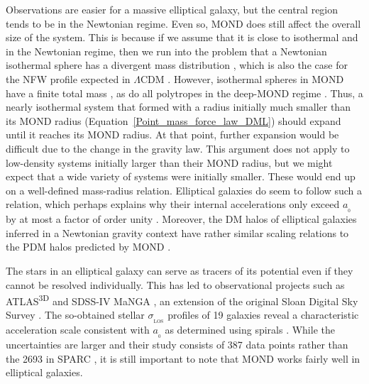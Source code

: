 \documentclass[fleqn,usenatbib,useAMS,onecolumn]{mnras} %
\begin{document}
Observations are easier for a massive elliptical galaxy, but the central region tends to be in the Newtonian regime. Even so, MOND does still affect the overall size of the system. This is because if we assume that it is close to isothermal and in the Newtonian regime, then we run into the problem that a Newtonian isothermal sphere has a divergent mass distribution \citep{Galactic_Dynamics}, which is also the case for the NFW profile expected in $\Lambda$CDM \citep*{Navarro_1997}. However, isothermal spheres in MOND have a finite total mass \citep{Milgrom_1984}, as do all polytropes in the deep-MOND regime \citep{Milgrom_2021_polytropes}. Thus, a nearly isothermal system that formed with a radius initially much smaller than its MOND radius (Equation~\ref{Point_mass_force_law_DML}) should expand until it reaches its MOND radius. At that point, further expansion would be difficult due to the change in the gravity law. This argument does not apply to low-density systems initially larger than their MOND radius, but we might expect that a wide variety of systems were initially smaller. These would end up on a well-defined mass-radius relation. Elliptical galaxies do seem to follow such a relation, which perhaps explains why their internal accelerations only exceed $a_{_0}$ by at most a factor of order unity \citep{Sanders_2000}. Moreover, the DM halos of elliptical galaxies inferred in a Newtonian gravity context have rather similar scaling relations to the PDM halos predicted by MOND \citep{Richtler_2011}.

The stars in an elliptical galaxy can serve as tracers of its potential even if they cannot be resolved individually. This has led to observational projects such as ATLAS\textsuperscript{3D} \citep{Cappellari_2013} and SDSS-IV MaNGA \citep{Bundy_2015}, an extension of the original Sloan Digital Sky Survey \citep[SDSS;][]{SDSS}. The so-obtained stellar $\sigma_{_\text{LOS}}$ profiles of 19 galaxies reveal a characteristic acceleration scale consistent with $a_{_0}$ as determined using spirals \citep{Chae_2020_elliptical}. While the uncertainties are larger and their study consists of 387 data points rather than the 2693 in SPARC \citep{SPARC}, it is still important to note that MOND works fairly well in elliptical galaxies.
\end{document}
